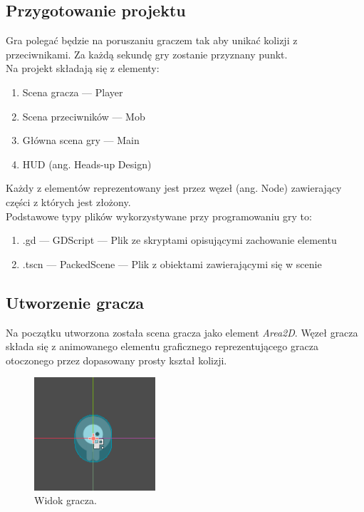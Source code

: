 \documentclass[a4paper,12pt]{article}
\begin{document}
\subsection{Przygotowanie projektu}
Gra polegać będzie na poruszaniu graczem tak aby unikać kolizji z przeciwnikami. Za każdą sekundę gry zostanie przyznany punkt.
\\

Na projekt składają się z elementy:
\begin{enumerate}
    \item Scena gracza --- Player
    \item Scena przeciwników --- Mob
    \item Główna scena gry --- Main
    \item HUD (ang. Heads-up Design)    
\end{enumerate}
Każdy z elementów reprezentowany jest przez węzeł (ang. Node) zawierający części z których jest złożony.\\

Podstawowe typy plików wykorzystywane przy programowaniu gry to:
\begin{enumerate}
    \item .gd --- GDScript --- Plik ze skryptami opisującymi zachowanie elementu
    \item .tscn --- PackedScene  --- Plik z obiektami zawierającymi się w scenie
\end{enumerate}

\newpage
\subsection{Utworzenie gracza}
Na początku utworzona została scena gracza jako element \textit{Area2D}. Węzeł gracza składa się z animowanego elementu graficznego reprezentującego gracza otoczonego przez dopasowany prosty kształ kolizji. 

\begin{figure}[h]
    \centering
    \includegraphics[width=0.4\textwidth]{player.png}
    \caption{Widok gracza.}
    \label{fig:player1}
\end{figure}
\end{document}
